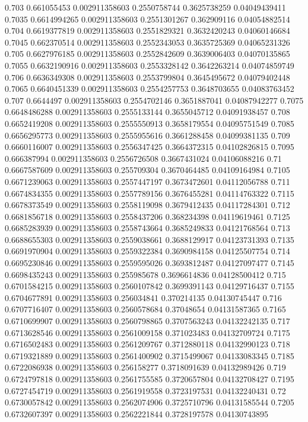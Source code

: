 {0.703 0.661055453 0.002911358603 0.2550758744 0.3625738259 0.04049439411
0.7035 0.6614994265 0.002911358603 0.2551301267 0.362909116 0.04054882514
0.704 0.6619377819 0.002911358603 0.2551829321 0.3632420243 0.04060146684
0.7045 0.662370514 0.002911358603 0.2552343053 0.3635725369 0.04065231326
0.705 0.6627976185 0.002911358603 0.2552842609 0.3639006403 0.04070135865
0.7055 0.6632190916 0.002911358603 0.2553328142 0.3642263214 0.04074859749
0.706 0.6636349308 0.002911358603 0.2553799804 0.3645495672 0.04079402448
0.7065 0.6640451339 0.002911358603 0.2554257753 0.3648703655 0.04083763452
0.707 0.6644497 0.002911358603 0.2554702146 0.3651887041 0.04087942277
0.7075 0.6648486288 0.002911358603 0.2555133144 0.3655045712 0.04091938457
0.708 0.6652419208 0.002911358603 0.2555550913 0.3658179554 0.04095751549
0.7085 0.6656295773 0.002911358603 0.2555955616 0.3661288458 0.04099381135
0.709 0.6660116007 0.002911358603 0.2556347425 0.3664372315 0.04102826815
0.7095 0.666387994 0.002911358603 0.2556726508 0.3667431024 0.04106088216
0.71 0.6667587609 0.002911358603 0.255709304 0.3670464485 0.04109164984
0.7105 0.6671239063 0.002911358603 0.2557447197 0.3673472601 0.04112056788
0.711 0.6674834355 0.002911358603 0.2557789156 0.3676455281 0.04114763322
0.7115 0.6678373549 0.002911358603 0.2558119098 0.3679412435 0.04117284301
0.712 0.6681856718 0.002911358603 0.2558437206 0.368234398 0.04119619461
0.7125 0.6685283939 0.002911358603 0.2558743664 0.3685249833 0.04121768564
0.713 0.6688655303 0.002911358603 0.2559038661 0.3688129917 0.04123731393
0.7135 0.6691970904 0.002911358603 0.2559322384 0.3690984158 0.04125507754
0.714 0.6695230846 0.002911358603 0.2559595026 0.3693812487 0.04127097477
0.7145 0.6698435243 0.002911358603 0.255985678 0.3696614836 0.04128500412
0.715 0.6701584215 0.002911358603 0.2560107842 0.3699391143 0.04129716437
0.7155 0.6704677891 0.002911358603 0.256034841 0.370214135 0.04130745447
0.716 0.6707716407 0.002911358603 0.2560578684 0.37048654 0.04131587365
0.7165 0.6710699907 0.002911358603 0.2560798865 0.3707563243 0.04132242135
0.717 0.6713628546 0.002911358603 0.2561009158 0.371023483 0.04132709724
0.7175 0.6716502483 0.002911358603 0.2561209767 0.3712880118 0.04132990123
0.718 0.6719321889 0.002911358603 0.2561400902 0.3715499067 0.04133083345
0.7185 0.6722086938 0.002911358603 0.256158277 0.3718091639 0.04132989426
0.719 0.6724797818 0.002911358603 0.2561755585 0.3720657804 0.04132708427
0.7195 0.6727454719 0.002911358603 0.2561919558 0.3723197531 0.04132240431
0.72 0.6730057842 0.002911358603 0.2562074906 0.3725710796 0.04131585544
0.7205 0.6732607397 0.002911358603 0.2562221844 0.3728197578 0.04130743895
}
